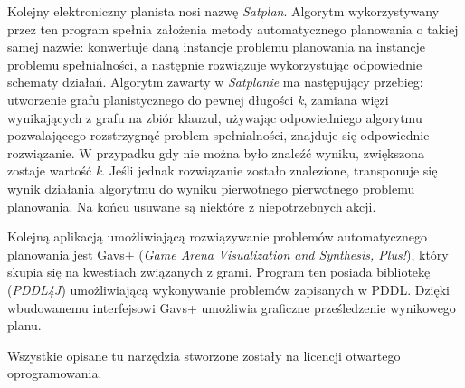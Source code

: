 Kolejny elektroniczny planista nosi nazwę \textit{Satplan}. Algorytm wykorzystywany przez ten program spełnia założenia metody automatycznego planowania o takiej samej nazwie: konwertuje daną instancje problemu planowania na instancje problemu spełnialności, a następnie rozwiązuje wykorzystując odpowiednie schematy działań. Algorytm zawarty w \textit{Satplanie} ma następujący przebieg: utworzenie grafu planistycznego do pewnej długości \textit{k}, zamiana więzi wynikających z grafu na zbiór klauzul, używając odpowiedniego algorytmu pozwalającego rozstrzygnąć problem spełnialności, znajduje się odpowiednie rozwiązanie. W przypadku gdy nie można było znaleźć wyniku, zwiększona zostaje wartość \textit{k}. Jeśli jednak rozwiązanie zostało znalezione, transponuje się wynik działania algorytmu do wyniku pierwotnego pierwotnego problemu planowania. Na końcu usuwane są niektóre z niepotrzebnych akcji.

Kolejną aplikacją umożliwiającą rozwiązywanie problemów automatycznego planowania jest Gavs+ (\textit{Game Arena Visualization and Synthesis, Plus!}), który skupia się na kwestiach związanych z grami. Program ten posiada bibliotekę (\textit{PDDL4J}) umożliwiającą wykonywanie problemów zapisanych w PDDL. Dzięki wbudowanemu interfejsowi Gavs+ umożliwia graficzne prześledzenie wynikowego planu.

Wszystkie opisane tu narzędzia stworzone zostały na licencji otwartego oprogramowania.

